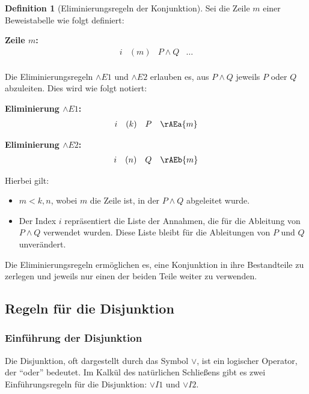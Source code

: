 \documentclass{book}
\theoremstyle{plain}
\theoremstyle{remark}
\theoremstyle{definition}
\newtheorem{definition}{Definition}[section]
\begin{document}
\begin{definition}[Eliminierungsregeln der Konjunktion]
Sei die Zeile \(m\) einer Beweistabelle wie folgt definiert:

\textbf{Zeile \(m\):}
\[
\begin{array}{llll}
    i & (m) & P \land Q & \dots \\
\end{array}
\]

Die Eliminierungsregeln \(\land E1\) und \(\land E2\) erlauben es, aus \(P \land Q\) jeweils \(P\) oder \(Q\) abzuleiten. Dies wird wie folgt notiert:

\textbf{Eliminierung \(\land E1\):}
\[
\begin{array}{llll}
    i & (k) & P & \rAEa{m} \\
\end{array}
\]

\textbf{Eliminierung \(\land E2\):}
\[
\begin{array}{llll}
    i & (n) & Q & \rAEb{m} \\
\end{array}
\]

Hierbei gilt:
\begin{itemize}
    \item \(m < k, n\), wobei \(m\) die Zeile ist, in der \(P \land Q\) abgeleitet wurde.
    \item Der Index \(i\) repräsentiert die Liste der Annahmen, die für die Ableitung von \(P \land Q\) verwendet wurden. Diese Liste bleibt für die Ableitungen von \(P\) und \(Q\) unverändert.
\end{itemize}

Die Eliminierungsregeln ermöglichen es, eine Konjunktion in ihre Bestandteile zu zerlegen und jeweils nur einen der beiden Teile weiter zu verwenden.
\end{definition}

\subsection{Regeln für die Disjunktion}

\subsubsection{Einführung der Disjunktion}
\label{rule:OI1}\label{rule:OI2}
Die Disjunktion, oft dargestellt durch das Symbol \(\lor\), ist ein logischer Operator, der \enquote{oder} bedeutet. Im Kalkül des natürlichen Schließens gibt es zwei Einführungsregeln für die Disjunktion: \(\lor I1\) und \(\lor I2\).
\end{document}
